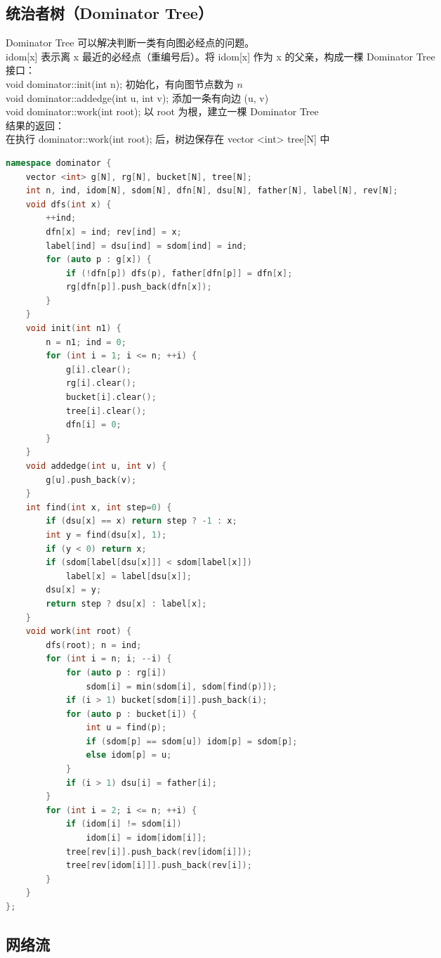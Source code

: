 \documentclass{article}
\begin{document}
\begin{CJK}{UTF8}{song}
\subsection{统治者树（Dominator Tree）}
Dominator Tree 可以解决判断一类有向图必经点的问题。
\\
idom[x] 表示离 x 最近的必经点（重编号后）。将 idom[x] 作为 x 的父亲，构成一棵 Dominator Tree
\\
接口：
\\
void dominator::init(int n); 初始化，有向图节点数为 $n$ 
\\
void dominator::addedge(int u, int v); 添加一条有向边 (u, v)
\\
void dominator::work(int root); 以 root 为根，建立一棵 Dominator Tree 
\\
结果的返回：
\\
在执行 dominator::work(int root); 后，树边保存在 vector <int> tree[N] 中
\begin{lstlisting}[language=C++]
namespace dominator {
	vector <int> g[N], rg[N], bucket[N], tree[N];
	int n, ind, idom[N], sdom[N], dfn[N], dsu[N], father[N], label[N], rev[N];
	void dfs(int x) {
		++ind;
		dfn[x] = ind; rev[ind] = x;
		label[ind] = dsu[ind] = sdom[ind] = ind;
		for (auto p : g[x]) {
			if (!dfn[p]) dfs(p), father[dfn[p]] = dfn[x];
			rg[dfn[p]].push_back(dfn[x]);
		}
	}
	void init(int n1) {
		n = n1; ind = 0;
		for (int i = 1; i <= n; ++i) {
			g[i].clear();
			rg[i].clear();
			bucket[i].clear();
			tree[i].clear();
			dfn[i] = 0;
		}
	}
	void addedge(int u, int v) {
		g[u].push_back(v);
	}
	int find(int x, int step=0) {
		if (dsu[x] == x) return step ? -1 : x;
		int y = find(dsu[x], 1);
		if (y < 0) return x;
		if (sdom[label[dsu[x]]] < sdom[label[x]])
			label[x] = label[dsu[x]];
		dsu[x] = y;
		return step ? dsu[x] : label[x];
	}
	void work(int root) {
		dfs(root); n = ind;
		for (int i = n; i; --i) {
			for (auto p : rg[i])
				sdom[i] = min(sdom[i], sdom[find(p)]);
			if (i > 1) bucket[sdom[i]].push_back(i);
			for (auto p : bucket[i]) {
				int u = find(p);
				if (sdom[p] == sdom[u]) idom[p] = sdom[p];
				else idom[p] = u;
			}
			if (i > 1) dsu[i] = father[i];
		}
		for (int i = 2; i <= n; ++i) {
			if (idom[i] != sdom[i])
				idom[i] = idom[idom[i]];
			tree[rev[i]].push_back(rev[idom[i]]);
			tree[rev[idom[i]]].push_back(rev[i]);
		}
	}
};
\end{lstlisting}
\subsection{网络流}

\end{CJK}
\end{document}
